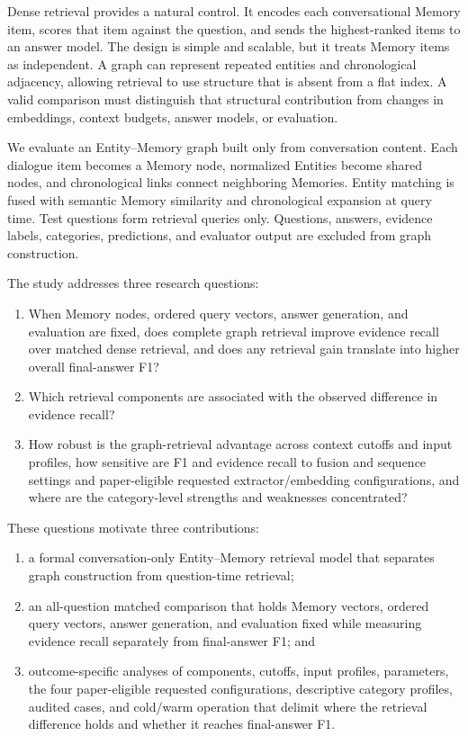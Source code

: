 \documentclass[10pt,twocolumn]{article}
\begin{document}
Dense retrieval provides a natural control. It encodes each conversational
Memory item, scores that item against the question, and sends the
highest-ranked items to an answer model. The design is simple and scalable,
but it treats Memory items as independent. A graph can represent repeated
entities and chronological adjacency, allowing retrieval to use structure
that is absent from a flat index. A valid comparison must distinguish that
structural contribution from changes in embeddings, context budgets, answer
models, or evaluation.

We evaluate an Entity--Memory graph built only from conversation content.
Each dialogue item becomes a Memory node, normalized Entities become shared
nodes, and chronological links connect neighboring Memories. Entity matching
is fused with semantic Memory similarity and chronological expansion at query
time. Test questions form retrieval queries only. Questions, answers, evidence
labels, categories, predictions, and evaluator output are excluded from graph
construction.

The study addresses three research questions:

\begin{enumerate}[label=\textbf{RQ\arabic*.}]
  \item When Memory nodes, ordered query vectors, answer generation, and
  evaluation are fixed, does complete graph retrieval improve evidence recall
  over matched dense retrieval, and does any retrieval gain translate into
  higher overall final-answer F1?
  \item Which retrieval components are associated with the observed
  difference in evidence recall?
  \item How robust is the graph-retrieval advantage across context cutoffs
  and input profiles, how sensitive are F1 and evidence recall to fusion and
  sequence settings and paper-eligible requested extractor/embedding
  configurations, and where are the category-level strengths and weaknesses
  concentrated?
\end{enumerate}

These questions motivate three contributions:

\begin{enumerate}[label=(\arabic*)]
  \item a formal conversation-only Entity--Memory retrieval model that
  separates graph construction from question-time retrieval;
  \item an all-question matched comparison that holds Memory vectors, ordered
  query vectors, answer generation, and evaluation fixed while measuring
  evidence recall separately from final-answer F1; and
  \item outcome-specific analyses of components, cutoffs, input profiles,
  parameters, the four paper-eligible requested configurations, descriptive
  category profiles, audited cases, and cold/warm operation that delimit where
  the retrieval difference holds and whether it reaches final-answer F1.
\end{enumerate}
\end{document}
